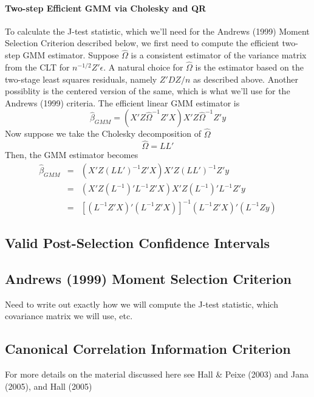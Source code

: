 \documentclass[12pt]{article}
\theoremstyle{definition}
\begin{document}
\paragraph{Two-step Efficient GMM via Cholesky and QR}
To calculate the J-test statistic, which we'll need for the Andrews (1999) Moment Selection Criterion described below, we first need to compute the efficient two-step GMM estimator. Suppose $\widehat{\Omega}$ is a consistent estimator of the variance matrix from the CLT for $n^{-1/2}Z'\epsilon$. A natural choice for $\widehat{\Omega}$ is the estimator based on the two-stage least squares residuals, namely $Z'DZ/n$ as described above. Another possiblity is the centered version of the same, which is what we'll use for the Andrews (1999) criteria. The efficient linear GMM estimator is
  $$\widehat{\beta}_{GMM} = \left(X'Z \widehat{\Omega}^{-1} Z'X\right)X'Z \widehat{\Omega}^{-1}Z'y$$
Now suppose we take the Cholesky decomposition of $\widehat{\Omega}$  
  $$\widehat{\Omega} = LL'$$
Then, the GMM estimator becomes
  \begin{eqnarray*}
    \widehat{\beta}_{GMM} &=& \left(X'Z \left(LL'\right)^{-1} Z'X\right)X'Z \left(LL'\right)^{-1}Z'y\\
      &=&  \left(X'Z (L^{-1})' L^{-1} Z'X\right)X'Z (L^{-1})' L^{-1} Z'y\\
      &=&\left[\left(L^{-1}Z' X \right)' \left(L^{-1}Z'X \right)\right]^{-1} \left(L^{-1}Z'X \right)'\left(L^{-1}Z y\right)
  \end{eqnarray*}

\subsection{Valid Post-Selection Confidence Intervals}

\subsection{Andrews (1999) Moment Selection Criterion}
Need to write out exactly how we will compute the J-test statistic, which covariance matrix we will use, etc.

\subsection{Canonical Correlation Information Criterion}
For more details on the material discussed here see Hall \& Peixe (2003) and Jana (2005), and Hall (2005)
\end{document}
